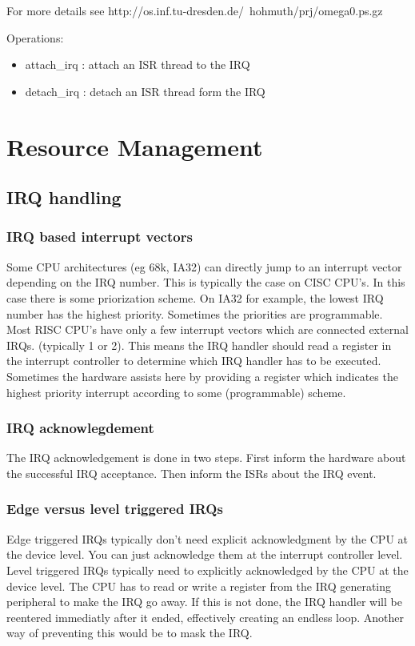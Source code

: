 For more details see http://os.inf.tu-dresden.de/~hohmuth/prj/omega0.ps.gz

Operations:
\begin{itemize}
\item attach\_irq : attach an ISR thread to the IRQ 
\item detach\_irq : detach an ISR thread form the IRQ
\end{itemize}


\section{Resource Management}

\subsection{IRQ handling}

\subsubsection{IRQ based interrupt vectors}

Some CPU architectures (eg 68k, IA32) can directly jump to an
interrupt vector depending on the IRQ number. This is typically the
case on CISC CPU's. In this case there is some priorization scheme. On
IA32 for example, the lowest IRQ number has the highest priority.
Sometimes the priorities are programmable.  Most RISC CPU's have only
a few interrupt vectors which are connected external IRQs. (typically
1 or 2). This means the IRQ handler should read a register in the
interrupt controller to determine which IRQ handler has to be
executed.  Sometimes the hardware assists here by providing a register
which indicates the highest priority interrupt according to some
(programmable) scheme.

\subsubsection{IRQ acknowlegdement}

The IRQ acknowledgement is done in two steps. First inform the
hardware about the successful IRQ acceptance. Then inform the ISRs
about the IRQ event.

\subsubsection{Edge versus level triggered IRQs}

Edge triggered IRQs typically don't need explicit acknowledgment by
the CPU at the device level. You can just acknowledge them at the
interrupt controller level.  Level triggered IRQs typically need to
explicitly acknowledged by the CPU at the device level. The CPU has to
read or write a register from the IRQ generating peripheral to make
the IRQ go away. If this is not done, the IRQ handler will be
reentered immediatly after it ended, effectively creating an endless
loop. Another way of preventing this would be to mask the IRQ.

